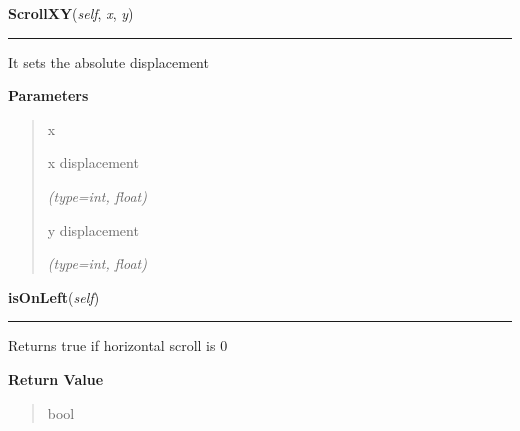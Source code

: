     \label{ImagePanel:ImagePanel:ScrollXY}

    \vspace{0.5ex}

\hspace{.8\funcindent}\begin{boxedminipage}{\funcwidth}

    \raggedright \textbf{ScrollXY}(\textit{self}, \textit{x}, \textit{y})

    \vspace{-1.5ex}

    \rule{\textwidth}{0.5\fboxrule}
\setlength{\parskip}{2ex}
    It sets the absolute displacement

\setlength{\parskip}{1ex}
      \textbf{Parameters}
      \vspace{-1ex}

      \begin{quote}
        \begin{Ventry}{x}

          \item[x]

          x displacement

            {\it (type=int, float)}

          \item[y]

          y displacement

            {\it (type=int, float)}

        \end{Ventry}

      \end{quote}

    \end{boxedminipage}

    \label{ImagePanel:ImagePanel:isOnLeft}

    \vspace{0.5ex}

\hspace{.8\funcindent}\begin{boxedminipage}{\funcwidth}

    \raggedright \textbf{isOnLeft}(\textit{self})

    \vspace{-1.5ex}

    \rule{\textwidth}{0.5\fboxrule}
\setlength{\parskip}{2ex}
    Returns true if horizontal scroll is 0

\setlength{\parskip}{1ex}
      \textbf{Return Value}
    \vspace{-1ex}

      \begin{quote}
      bool

      \end{quote}

    \end{boxedminipage}

